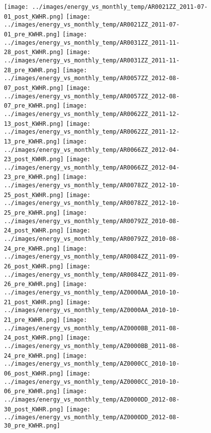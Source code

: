 \clearpage
\begin{figure}
\centering
\texttt{[image: ../images/energy\_vs\_monthly\_temp/AR0021ZZ\_2011-07-01\_post\_KWHR.png]}
\texttt{[image: ../images/energy\_vs\_monthly\_temp/AR0021ZZ\_2011-07-01\_pre\_KWHR.png]}
\texttt{[image: ../images/energy\_vs\_monthly\_temp/AR0031ZZ\_2011-11-28\_post\_KWHR.png]}
\texttt{[image: ../images/energy\_vs\_monthly\_temp/AR0031ZZ\_2011-11-28\_pre\_KWHR.png]}
\texttt{[image: ../images/energy\_vs\_monthly\_temp/AR0057ZZ\_2012-08-07\_post\_KWHR.png]}
\texttt{[image: ../images/energy\_vs\_monthly\_temp/AR0057ZZ\_2012-08-07\_pre\_KWHR.png]}
\texttt{[image: ../images/energy\_vs\_monthly\_temp/AR0062ZZ\_2011-12-13\_post\_KWHR.png]}
\texttt{[image: ../images/energy\_vs\_monthly\_temp/AR0062ZZ\_2011-12-13\_pre\_KWHR.png]}
\texttt{[image: ../images/energy\_vs\_monthly\_temp/AR0066ZZ\_2012-04-23\_post\_KWHR.png]}
\texttt{[image: ../images/energy\_vs\_monthly\_temp/AR0066ZZ\_2012-04-23\_pre\_KWHR.png]}
\texttt{[image: ../images/energy\_vs\_monthly\_temp/AR0078ZZ\_2012-10-25\_post\_KWHR.png]}
\texttt{[image: ../images/energy\_vs\_monthly\_temp/AR0078ZZ\_2012-10-25\_pre\_KWHR.png]}
\texttt{[image: ../images/energy\_vs\_monthly\_temp/AR0079ZZ\_2010-08-24\_post\_KWHR.png]}
\texttt{[image: ../images/energy\_vs\_monthly\_temp/AR0079ZZ\_2010-08-24\_pre\_KWHR.png]}
\texttt{[image: ../images/energy\_vs\_monthly\_temp/AR0084ZZ\_2011-09-26\_post\_KWHR.png]}
\texttt{[image: ../images/energy\_vs\_monthly\_temp/AR0084ZZ\_2011-09-26\_pre\_KWHR.png]}
\texttt{[image: ../images/energy\_vs\_monthly\_temp/AZ0000AA\_2010-10-21\_post\_KWHR.png]}
\texttt{[image: ../images/energy\_vs\_monthly\_temp/AZ0000AA\_2010-10-21\_pre\_KWHR.png]}
\texttt{[image: ../images/energy\_vs\_monthly\_temp/AZ0000BB\_2011-08-24\_post\_KWHR.png]}
\texttt{[image: ../images/energy\_vs\_monthly\_temp/AZ0000BB\_2011-08-24\_pre\_KWHR.png]}
\texttt{[image: ../images/energy\_vs\_monthly\_temp/AZ0000CC\_2010-10-06\_post\_KWHR.png]}
\texttt{[image: ../images/energy\_vs\_monthly\_temp/AZ0000CC\_2010-10-06\_pre\_KWHR.png]}
\texttt{[image: ../images/energy\_vs\_monthly\_temp/AZ0000DD\_2012-08-30\_post\_KWHR.png]}
\texttt{[image: ../images/energy\_vs\_monthly\_temp/AZ0000DD\_2012-08-30\_pre\_KWHR.png]}
\end{figure}
